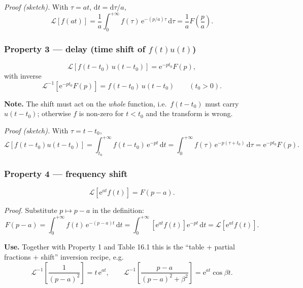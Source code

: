 \documentclass[11pt,a4paper]{article}
\theoremstyle{definition}
\theoremstyle{plain}
\begin{document}
\textit{Proof (sketch).} With $\tau=at$, $\mathrm{d}t=\mathrm{d}\tau/a$,
\begin{equation*}
\mathcal{L}\left[f(at)\right]=\frac{1}{a}\int_{0}^{+\infty} f(\tau)\,\mathrm{e}^{-(p/a)\tau}\,\mathrm{d}\tau
=\frac{1}{a}F\!\left(\frac{p}{a}\right).
\end{equation*}

\clearpage
\subsubsection{Property 3 --- delay (time shift of $f(t)u(t)$)}

\begin{equation}
\mathcal{L}\left[f(t-t_0)\,u(t-t_0)\right]=\mathrm{e}^{-pt_0}F(p), \tag{16.22}
\end{equation}
with inverse
\begin{equation}
\mathcal{L}^{-1}\left[\mathrm{e}^{-pt_0}F(p)\right]=f(t-t_0)\,u(t-t_0)\qquad(t_0>0). \tag{16.23}
\end{equation}

\textbf{Note.} The shift must act on the \emph{whole} function, i.e.\ $f(t-t_0)$ must carry
$u(t-t_0)$; otherwise $f$ is non-zero for $t<t_0$ and the transform is wrong.

\textit{Proof (sketch).} With $\tau=t-t_0$,
\begin{equation*}
\mathcal{L}\left[f(t-t_0)u(t-t_0)\right]
=\int_{t_0}^{+\infty} f(t-t_0)\,\mathrm{e}^{-pt}\,\mathrm{d}t
=\int_{0}^{+\infty} f(\tau)\,\mathrm{e}^{-p(\tau+t_0)}\,\mathrm{d}\tau
=\mathrm{e}^{-pt_0}F(p).
\end{equation*}

\subsubsection{Property 4 --- frequency shift}

\begin{equation}
\mathcal{L}\left[\mathrm{e}^{at}f(t)\right]=F(p-a). \tag{16.24}
\end{equation}

\textit{Proof.} Substitute $p\mapsto p-a$ in the definition:
\begin{equation*}
F(p-a)=\int_{0}^{+\infty} f(t)\,\mathrm{e}^{-(p-a)t}\,\mathrm{d}t
=\int_{0}^{+\infty}\left[\mathrm{e}^{at}f(t)\right]\mathrm{e}^{-pt}\,\mathrm{d}t
=\mathcal{L}\left[\mathrm{e}^{at}f(t)\right].
\end{equation*}

\textbf{Use.} Together with Property 1 and Table 16.1 this is the ``table + partial fractions +
shift'' inversion recipe, e.g.
\begin{equation*}
\mathcal{L}^{-1}\left[\frac{1}{(p-a)^{2}}\right]=t\,\mathrm{e}^{at},\qquad
\mathcal{L}^{-1}\left[\frac{p-a}{(p-a)^{2}+\beta^{2}}\right]=\mathrm{e}^{at}\cos\beta t .
\end{equation*}
\end{document}
